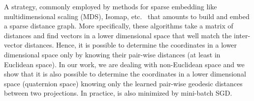 A strategy, commonly employed by methods for sparse embedding like multidimensional scaling (MDS), Isomap, etc.~\cite{platt2004fast, 5438584,DBLP:journals/corr/abs-1811-10470} that amounts to build and embed a sparse distance graph.
More specifically, these algorithms take a matrix of distances and find vectors in a lower dimensional space that well match the inter-vector distances.
Hence, it is possible to determine the coordinates in a lower dimensional space only by knowing their pair-wise distances (at least in Euclidean space).
In our work, we are dealing with non-Euclidean space and we show that it is also possible to determine the coordinates in a lower dimensional space (quaternion space) knowing only the learned pair-wise geodesic distances between two projections.
In practice,  is also minimized by mini-batch SGD.
